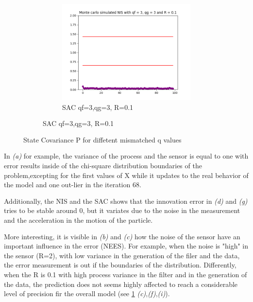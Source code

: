 \documentclass{article}
\begin{document}
\begin{figure}[H]
\begin{subfigure}{1\textwidth}
\begin{subfigure}{.3\textwidth}
                    \includegraphics[width=1\linewidth]{./img/mc/sac3r01.png}
                    \caption{ SAC qf=3,qg=3, R=0.1 }
                \end{subfigure}
            \end{subfigure}
            \caption{State Covariance P for diffetent mismatched q values}
            \label{fig:mcMatError}
        \end{figure}
        
        In \textit{(a)} for example, the variance of the process and the sensor is equal to one with error results
        inside of the chi-square distribution boundaries of the problem,excepting for the first values of X while it updates 
        to  the real behavior of the model and one out-lier in the iteration 68.

        Additionally, the NIS and the SAC shows that the innovation error in \textit{(d)} and \textit{(g)} tries to be stable around
        0, but it variates due to the noise in the measurement and the acceleration in the motion of the particle.

        More interesting, it is visible in \textit{(b)} and \textit{(c)} how the noise of the sensor have an important influence in the error (NEES).
        For example, when the noise is "high" in the sensor (R=2), with low variance in the generation of the filer and the data, the error measurement
        is out if the boundaries of the distribution. Differently, when the R is 0.1 with high process variance in the filter and in the generation of the
        data, the prediction does not seems highly affected to reach a considerable level of precision fir the overall model (see \ref{fig:mcMatError} \textit{(c)},\textit{(f)},\textit{(i)}).
\end{document}
